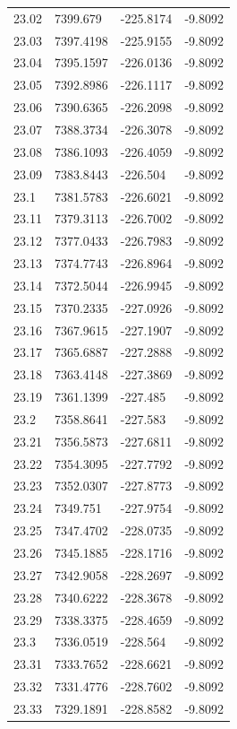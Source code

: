 \begin{table}[H]
\begin{tabular}{llll}
23.02 & 7399.679 & -225.8174 & -9.8092 \\
23.03 & 7397.4198 & -225.9155 & -9.8092 \\
23.04 & 7395.1597 & -226.0136 & -9.8092 \\
23.05 & 7392.8986 & -226.1117 & -9.8092 \\
23.06 & 7390.6365 & -226.2098 & -9.8092 \\
23.07 & 7388.3734 & -226.3078 & -9.8092 \\
23.08 & 7386.1093 & -226.4059 & -9.8092 \\
23.09 & 7383.8443 & -226.504 & -9.8092 \\
23.1 & 7381.5783 & -226.6021 & -9.8092 \\
23.11 & 7379.3113 & -226.7002 & -9.8092 \\
23.12 & 7377.0433 & -226.7983 & -9.8092 \\
23.13 & 7374.7743 & -226.8964 & -9.8092 \\
23.14 & 7372.5044 & -226.9945 & -9.8092 \\
23.15 & 7370.2335 & -227.0926 & -9.8092 \\
23.16 & 7367.9615 & -227.1907 & -9.8092 \\
23.17 & 7365.6887 & -227.2888 & -9.8092 \\
23.18 & 7363.4148 & -227.3869 & -9.8092 \\
23.19 & 7361.1399 & -227.485 & -9.8092 \\
23.2 & 7358.8641 & -227.583 & -9.8092 \\
23.21 & 7356.5873 & -227.6811 & -9.8092 \\
23.22 & 7354.3095 & -227.7792 & -9.8092 \\
23.23 & 7352.0307 & -227.8773 & -9.8092 \\
23.24 & 7349.751 & -227.9754 & -9.8092 \\
23.25 & 7347.4702 & -228.0735 & -9.8092 \\
23.26 & 7345.1885 & -228.1716 & -9.8092 \\
23.27 & 7342.9058 & -228.2697 & -9.8092 \\
23.28 & 7340.6222 & -228.3678 & -9.8092 \\
23.29 & 7338.3375 & -228.4659 & -9.8092 \\
23.3 & 7336.0519 & -228.564 & -9.8092 \\
23.31 & 7333.7652 & -228.6621 & -9.8092 \\
23.32 & 7331.4776 & -228.7602 & -9.8092 \\
23.33 & 7329.1891 & -228.8582 & -9.8092 \\

\end{tabular}
\end{table}

